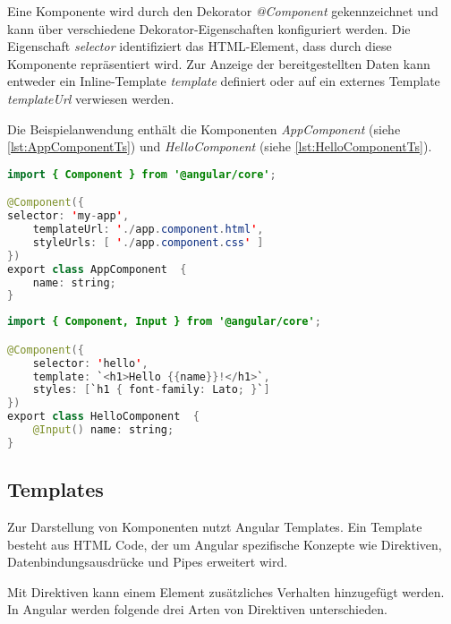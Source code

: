Eine Komponente wird durch den Dekorator \textit{@Component} gekennzeichnet und kann über verschiedene Dekorator-Eigenschaften konfiguriert werden. Die Eigenschaft \textit{selector} identifiziert das HTML-Element, dass durch diese Komponente repräsentiert wird. Zur Anzeige der bereitgestellten Daten kann entweder ein Inline-Template \textit{template} definiert oder auf ein externes Template \textit{templateUrl} verwiesen werden. \autocites[vgl.][]{Google.b}[vgl.][405]{Freeman.2018}[vgl.][47\psqq]{Steyer.2017}

Die Beispielanwendung enthält die Komponenten \textit{AppComponent} (siehe \autoref{lst:AppComponentTs}) und \textit{HelloComponent} (siehe \autoref{lst:HelloComponentTs}).

\begin{lstlisting}[caption=Die Komponente AppComponent in der Datei app.component.ts, label=lst:AppComponentTs, language=Java]
import { Component } from '@angular/core';

@Component({
selector: 'my-app',
	templateUrl: './app.component.html',
	styleUrls: [ './app.component.css' ]
})
export class AppComponent  {
	name: string;
}
\end{lstlisting}

\begin{lstlisting}[caption=Die Komponente HelloComponent in der Datei hello.component.ts, label=lst:HelloComponentTs, language=Java]
import { Component, Input } from '@angular/core';

@Component({
	selector: 'hello',
	template: `<h1>Hello {{name}}!</h1>`,
	styles: [`h1 { font-family: Lato; }`]
})
export class HelloComponent  {
	@Input() name: string;
}
\end{lstlisting}

\subsection{Templates}\label{sec:aTemp}
Zur Darstellung von Komponenten nutzt Angular Templates. Ein Template besteht aus HTML Code, der um Angular spezifische Konzepte wie Direktiven, Datenbindungsausdrücke und Pipes erweitert wird. \autocites[vgl.][]{Google.b}[vgl.][52]{Steyer.2017} 

Mit Direktiven kann einem Element zusätzliches Verhalten hinzugefügt werden. \autocites[vgl.][265]{Steyer.2017}[vgl.][401]{Freeman.2018} In Angular werden folgende drei Arten von Direktiven unterschieden. \autocite[vgl.][]{Google.}

